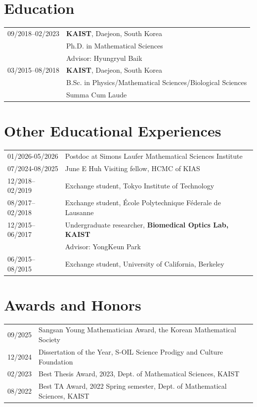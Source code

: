 \documentclass[a4paper, 10pt]{article}
\begin{document}
\section{Education}

\begin{tabular}{Q{2.45cm}P{13cm}}
\small{09/2018–02/2023} & \textbf{KAIST}, Daejeon, South Korea\\
& Ph.D. in Mathematical Sciences\\
& \small Advisor: Hyungryul Baik \\
\small{03/2015–08/2018} & \textbf{KAIST}, Daejeon, South Korea\\
& B.Sc. in Physics/Mathematical Sciences/Biological Sciences  \\
& Summa Cum Laude
\end{tabular}


\section{Other Educational Experiences}

\begin{tabular}{Q{2.45cm}P{13cm}}
\small{01/2026-05/2026} & Postdoc at Simons Laufer Mathematical Sciences Institute\\
\small{07/2024-08/2025} & June E Huh Visiting fellow, HCMC of KIAS \\
\small{12/2018–02/2019} & Exchange student, Tokyo Institute of Technology \\
\small{08/2017–02/2018} & Exchange student, École Polytechnique Féderale de Lausanne \\
\small{12/2015–06/2017} & Undergraduate researcher, \textbf{Biomedical Optics Lab, KAIST} \\
& \small  Advisor: YongKeun Park\\
\small{06/2015–08/2015}& Exchange student, University of California, Berkeley \\
\end{tabular}

\section{Awards and Honors}

\begin{tabular}{Q{2.45cm}P{13cm}}
\small{09/2025} & Sangsan Young Mathematician Award, the Korean Mathematical Society\\
\small{12/2024} & Dissertation of the Year, S-OIL Science Prodigy and Culture Foundation\\
\small{02/2023} & Best Thesis Award, 2023, Dept. of Mathematical Sciences, KAIST\\
\small{08/2022} & Best TA Award, 2022 Spring semester, Dept. of Mathematical Sciences, KAIST\\
\end{tabular}
\end{document}
